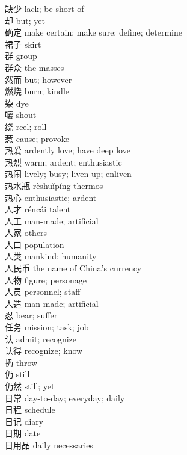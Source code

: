 缺少 \quad lack; be short of\\
却 \quad but; yet\\
确定 \quad make certain; make sure; define; determine\\
裙子 \quad skirt\\
群 \quad group\\
群众 \quad the masses\\
然而 \quad but; however\\
燃烧 \quad burn; kindle\\
染 \quad dye\\
嚷 \quad shout\\
绕 \quad reel; roll\\
惹 \quad cause; provoke\\
热爱 \quad ardently love; have deep love\\
热烈 \quad warm; ardent; enthusiastic\\
热闹 \quad lively; busy; liven up; enliven\\
热水瓶 \quad rèshuǐpíng \quad thermos\\
热心 \quad enthusiastic; ardent\\
人才 \quad réncái \quad talent\\
人工 \quad man-made; artificial\\
人家 \quad others\\
人口 \quad population\\
人类 \quad mankind; humanity\\
人民币 \quad the name of China's currency\\
人物 \quad figure; personage\\
人员 \quad personnel; staff\\
人造 \quad man-made; artificial\\
忍 \quad bear; suffer\\
任务 \quad mission; task; job\\
认 \quad admit; recognize\\
认得 \quad recognize; know\\
扔 \quad throw\\
仍 \quad still\\
仍然 \quad still; yet\\
日常 \quad day-to-day; everyday; daily\\
日程 \quad schedule\\
日记 \quad diary\\
日期 \quad date\\
日用品 \quad daily necessaries\\
